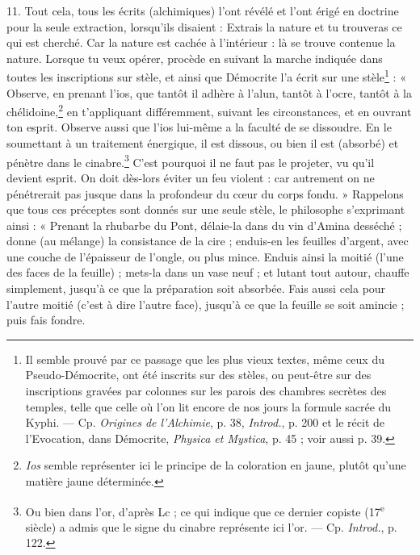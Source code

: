 \documentclass[a4paper, 11pt, oneside, polutonikogreek, french]{article}
\begin{document}
11. Tout cela, tous les écrits (alchimiques) l'ont révélé et l'ont érigé en doctrine pour la seule extraction, lorsqu'ils disaient : Extrais la nature et tu trouveras ce qui est cherché. Car la nature est cachée à l'intérieur : là se trouve contenue la nature. Lorsque tu veux opérer, procède en suivant la marche indiquée dans toutes les inscriptions sur stèle, et ainsi que Démocrite l'a écrit sur une stèle\footnote{Il semble prouvé par ce passage que les plus vieux textes, même ceux du Pseudo-Démocrite, ont été inscrits sur des stèles, ou peut-être sur des inscriptions gravées par colonnes sur les parois des chambres secrètes des temples, telle que celle où l'on lit encore de nos jours la formule sacrée du Kyphi. --- Cp. \emph{Origines de l'Alchimie}, p. 38, \emph{Introd.}, p. 200 et le récit de l'Evocation, dans Démocrite, \emph{Physica et Mystica}, p. 45 ; voir aussi p. 39.} : « Observe, en prenant l'ios, que tantôt il adhère à l'alun, tantôt à l'ocre, tantôt à la chélidoine,\footnote{\emph{Ios} semble représenter ici le principe de la coloration en jaune, plutôt qu'une matière jaune déterminée.} en t'appliquant différemment, suivant les circonstances, et en ouvrant ton esprit. Observe aussi que l'ios lui-même a la faculté de se dissoudre. En le soumettant à un traitement énergique, il est dissous, ou bien il est (absorbé) et pénètre dans le cinabre.\footnote{Ou bien dans l'or, d'après Lc ; ce qui indique que ce dernier copiste (17\textsuperscript{e} siècle) a admis que le signe du cinabre représente ici l'or. --- Cp. \emph{Introd.}, p. 122.} C'est pourquoi il ne faut pas le projeter, vu qu'il devient esprit. On doit dès-lors éviter un feu violent : car autrement on ne pénétrerait pas jusque dans la profondeur du cœur du corps fondu. » Rappelons que tous ces préceptes sont donnés sur une seule stèle, le philosophe s'exprimant ainsi : « Prenant la rhubarbe du Pont, délaie-la dans du vin d'Amina desséché ; donne (au mélange) la consistance de la cire ; enduis-en les feuilles d'argent, avec une couche de l'épaisseur de l'ongle, ou plus mince. Enduis ainsi la moitié (l'une des faces de la feuille) ; mets-la dans un vase neuf ; et lutant tout autour, chauffe simplement, jusqu'à ce que la préparation soit absorbée. Fais aussi cela pour l'autre moitié (c'est à dire l'autre face), jusqu'à ce que la feuille se soit amincie ; puis fais fondre.
\end{document}
